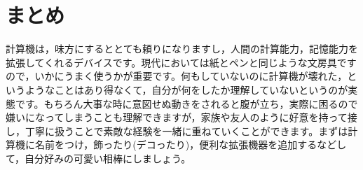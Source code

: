 \documentclass{ltjsbook}
\begin{document}
\section{まとめ}

計算機は，味方にするととても頼りになりますし，人間の計算能力，記憶能力を拡張してくれるデバイスです。現代においては紙とペンと同じような文房具ですので，いかにうまく使うかが重要です。何もしていないのに計算機が壊れた，というようなことはあり得なくて，自分が何をしたか理解していないというのが実態です。もちろん大事な時に意図せぬ動きをされると腹が立ち，実際に困るので嫌いになってしまうことも理解できますが，家族や友人のように好意を持って接し，丁寧に扱うことで素敵な経験を一緒に重ねていくことができます。まずは計算機に名前をつけ，飾ったり(デコったり)，便利な拡張機器を追加するなどして，自分好みの可愛い相棒にしましょう。
\end{document}
